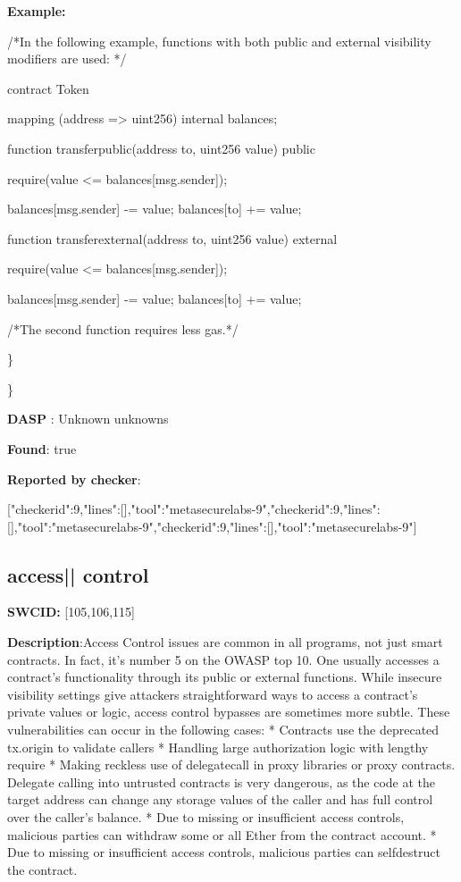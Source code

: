 \documentclass{article}
\begin{document}
\textbf{Example:} 
\begin{ffcode} 

 /*In the following example, functions with both public and external visibility modifiers are used: */ 

contract Token {

    mapping (address => uint256) internal \textunderscore balances;

    function transfer\textunderscore public(address to, uint256 value) public {
        require(value <= \textunderscore balances[msg.sender]);

        \textunderscore balances[msg.sender] -= value;
        \textunderscore balances[to] += value;
    }

    function transfer\textunderscore external(address to, uint256 value) external {
        require(value <= \textunderscore balances[msg.sender]);

        \textunderscore balances[msg.sender] -= value;
        \textunderscore balances[to] += value;
    }
}

 /*The second function requires less gas.*/ 

\end{ffcode} 
\} 

\} 

\textbf{DASP} : Unknown unknowns

\textbf{Found}: true

\textbf{Reported by checker}: 
\begin{ffcode} 

[{"checker\textunderscore id":9,"lines":[],"tool":"metasecurelabs-9"},{"checker\textunderscore id":9,"lines":[],"tool":"metasecurelabs-9"},{"checker\textunderscore id":9,"lines":[],"tool":"metasecurelabs-9"}]
\end{ffcode} 
\subsection{access{|\textunderscore| }control} 
\textbf{SWC{\textunderscore }ID:} [105,106,115]

\textbf{Description}:Access Control issues are common in all programs, not just smart contracts. In fact, it's number 5 on the OWASP top 10. One usually accesses a contract's functionality through its public or external functions. While insecure visibility settings give attackers straightforward ways to access a contract's private values or logic, access control bypasses are sometimes more subtle. These vulnerabilities can occur in the following cases:
* Contracts use the deprecated tx.origin to validate callers
* Handling large authorization logic with lengthy require
* Making reckless use of delegatecall in proxy libraries or proxy contracts. Delegate calling into untrusted contracts is very dangerous, as the code at the target address can change any storage values of the caller and has full control over the caller's balance.
* Due to missing or insufficient access controls, malicious parties can withdraw some or all Ether from the contract account.
* Due to missing or insufficient access controls, malicious parties can self{\textendash}destruct the contract.
\end{document}

